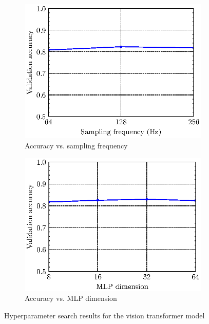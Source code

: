 \begin{figure}
\begin{subfigure}[b]{0.45\textwidth}
        \includegraphics[width=\textwidth]{assets/acc_vs_hyperparam/sampling_freq.eps}
        \caption{Accuracy vs. sampling frequency}
        \label{fig:samp_freq_acc}
    \end{subfigure}
    \hfill
    \begin{subfigure}[b]{0.45\textwidth}
        \includegraphics[width=\textwidth]{assets/acc_vs_hyperparam/mlp_dim.eps}
        \caption{Accuracy vs. MLP dimension}
        \label{fig:mlp_dense_layers_acc}
    \end{subfigure}
    \caption{Hyperparameter search results for the vision transformer model}
    \label{fig:model_hyperparameters}
\end{figure}


